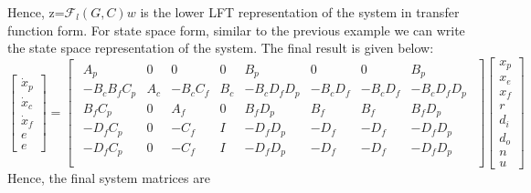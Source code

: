 \documentclass[a4paper,12pt]{article}
\begin{document}
			Hence, z=$\mathscr{F}_{l}(G,C)w$ is the lower LFT representation of the system in transfer function form. For state space form, similar to the previous example we can write the state space representation of the system. The final result is given below: 
			\[
				\begin{bmatrix}
				\dot{x}_{p} \\
				\dot{x}_{c} \\
				\dot{x}_{f} \\				
				\hline
				e \\
				\hline
				e
				\end{bmatrix}
				=
				\begin{bmatrix}
				\begin{array}{ccc|cccc|c}
				A_{p} & 0 & 0 & 0 & B_{p} & 0 & 0 & B_{p}\\
				-B_{c}B_{f}C_{p} & A_{c} & -B_{c}C_{f} & B_{c} & -B_{c}D_{f}D_{p} & -B_{c}D_{f} & -B_{c}D_{f} & -B_{c}D_{f}D_{p}\\
				B_{f}C_{p} & 0 & A_{f} & 0 & B_{f}D_{p} & B_{f} & B_{f} & B_{f}D_{p} \\
				\hline
				-D_{f}C_{p} & 0 & -C_{f} & I & -D_{f}D_{p} & -D_{f} & -D_{f} & -D_{f}D_{p} \\
				\hline
				-D_{f}C_{p} & 0 & -C_{f} & I & -D_{f}D_{p} & -D_{f} & -D_{f} & -D_{f}D_{p} \\
				\end{array}
				\end{bmatrix}
				\begin{bmatrix}
				x_{p} \\ x_{e} \\ x_{f} \\ \hline r \\ d_{i} \\ d_{o} \\ n \\ \hline u 
				\end{bmatrix}	
				\]
				Hence, the final system matrices are
				
\end{document}
